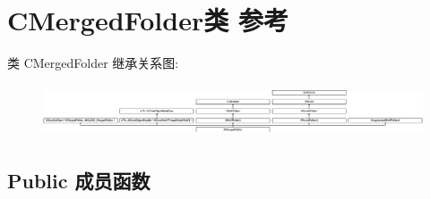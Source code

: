 \hypertarget{class_c_merged_folder}{}\section{C\+Merged\+Folder类 参考}
\label{class_c_merged_folder}
类 C\+Merged\+Folder 继承关系图\+:\begin{figure}[H]
\begin{center}
\leavevmode
\includegraphics[height=1.568627cm]{class_c_merged_folder}
\end{center}
\end{figure}
\subsection*{Public 成员函数}
